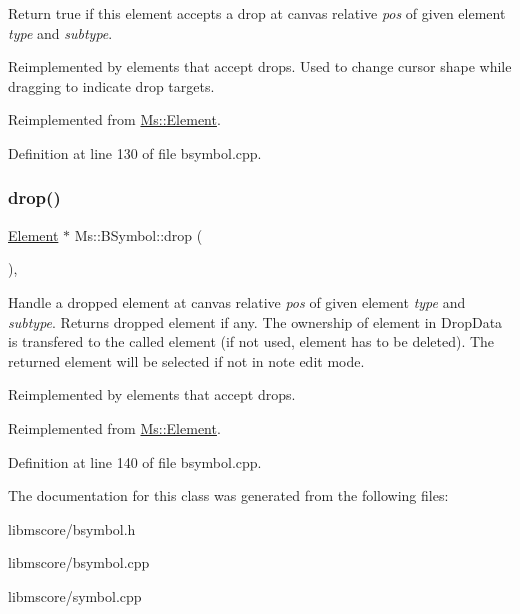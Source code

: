 Return true if this element accepts a drop at canvas relative {\itshape pos} of given element {\itshape type} and {\itshape subtype}.

Reimplemented by elements that accept drops. Used to change cursor shape while dragging to indicate drop targets. 

Reimplemented from \hyperlink{class_ms_1_1_element_a35614445f0bc2212cbcc75c3f5810543}{Ms\+::\+Element}.



Definition at line 130 of file bsymbol.\+cpp.

\mbox{\label{class_ms_1_1_b_symbol_a88e83f2a4c92f2c1fcea20b2834f0a69}} 
\subsubsection{\texorpdfstring{drop()}{drop()}}
{\footnotesize\ttfamily \hyperlink{class_ms_1_1_element}{Element} $\ast$ Ms\+::\+B\+Symbol\+::drop (\begin{DoxyParamCaption}\item[{\hyperlink{class_ms_1_1_edit_data}{Edit\+Data} \&}]{ }\end{DoxyParamCaption})\hspace{0.3cm}{\ttfamily [override]}, {\ttfamily [virtual]}}

Handle a dropped element at canvas relative {\itshape pos} of given element {\itshape type} and {\itshape subtype}. Returns dropped element if any. The ownership of element in Drop\+Data is transfered to the called element (if not used, element has to be deleted). The returned element will be selected if not in note edit mode.

Reimplemented by elements that accept drops. 

Reimplemented from \hyperlink{class_ms_1_1_element_a0ca69a9fb48e7b9fb481aacaf3860032}{Ms\+::\+Element}.



Definition at line 140 of file bsymbol.\+cpp.



The documentation for this class was generated from the following files\+:\begin{DoxyCompactItemize}
\item 
libmscore/bsymbol.\+h\item 
libmscore/bsymbol.\+cpp\item 
libmscore/symbol.\+cpp\end{DoxyCompactItemize}
